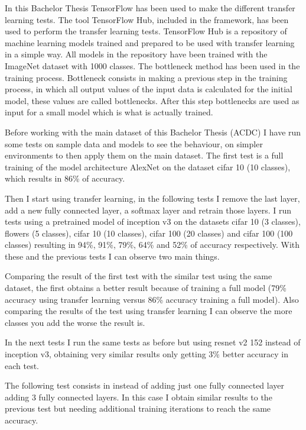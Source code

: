 \documentclass[12pt,a4paper]{article}
\begin{document}
In this Bachelor Thesis TensorFlow has been used to make the different transfer learning tests. The tool TensorFlow Hub, included in the framework, has been used to perform the transfer learning tests. TensorFlow Hub is a repository of machine learning models trained and prepared to be used with transfer learning in a simple way. All models in the repository have been trained with the ImageNet \cite{imagenet} dataset with 1000 classes. The bottleneck method has been used in the training process. Bottleneck consists in making a previous step in the training process, in which all output values of the input data is calculated for the initial model, these values are called bottlenecks. After this step bottlenecks are used as input for a small model which is what is actually trained.
\bigskip

Before working with the main dataset of this Bachelor Thesis (ACDC) \cite{acdcdataset} I have run some tests on sample data and models to see the behaviour, on simpler environments to then apply them on the main dataset. The first test is a full training of the model architecture AlexNet on the dataset cifar 10 (10 classes), which results in 86\% of accuracy.
\bigskip

Then I start using transfer learning, in the following tests I remove the last layer, add a new fully connected layer, a softmax layer and retrain those layers. I run tests using a pretrained model of inception v3 on the datasets cifar 10 (3 classes), flowers (5 classes), cifar 10 (10 classes), cifar 100 (20 classes) and cifar 100 (100 classes) resulting in 94\%, 91\%, 79\%, 64\% and 52\% of accuracy respectively. With these and the previous tests I can observe two main things.
\bigskip

Comparing the result of the first test with the similar test using the same dataset, the first obtains a better result because of training a full model (79\% accuracy using transfer learning versus 86\% accuracy training a full model). Also comparing the results of the test using transfer learning I can observe the more classes you add the worse the result is.
\bigskip

In the next tests I run the same tests as before but using resnet v2 152 instead of inception v3, obtaining very similar results only getting 3\% better accuracy in each test.
\bigskip

The following test consists in instead of adding just one fully connected layer adding 3 fully connected layers. In this case I obtain similar results to the previous test but needing additional training iterations to reach the same accuracy.
\bigskip
\end{document}
